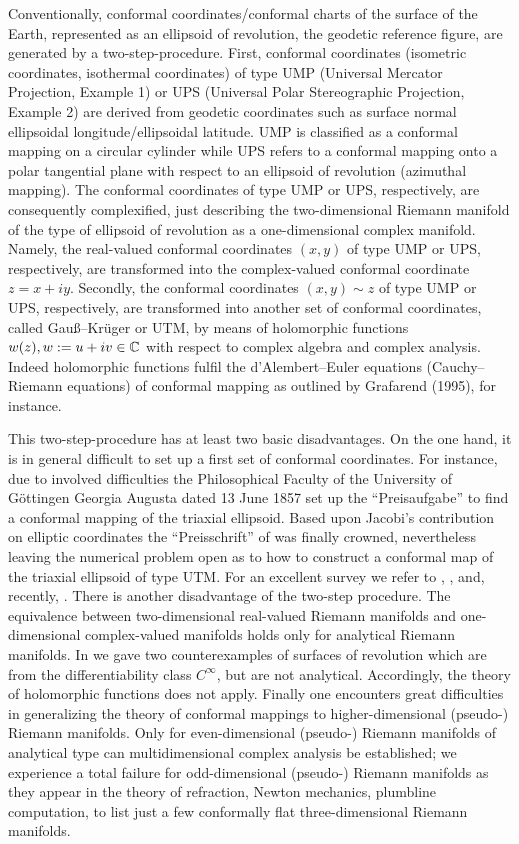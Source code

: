 \documentclass[jog]{svjour}
\begin{document}
Conventionally, conformal coordinates/conformal charts of the surface of
the Earth, represented as an ellipsoid of revolution, the geodetic
reference figure, are generated by a two-step-procedure. First,
conformal coordinates (isometric coordinates, isothermal coordinates) of
type UMP (Universal Mercator Projection, Example 1) or UPS (Universal
Polar Stereographic Projection, Example 2) are derived from geodetic
coordinates such as surface normal ellipsoidal longitude/ellipsoidal
latitude. UMP is classified as a conformal mapping on a circular
cylinder while UPS refers to a conformal mapping onto a polar tangential
plane with respect to an ellipsoid of revolution (azimuthal mapping).
The conformal coordinates of type UMP or UPS, respectively, are
consequently complexified, just describing the two-dimensional Riemann
manifold of the type of ellipsoid of revolution as a one-dimensional
complex manifold. Namely, the real-valued conformal coordinates $(x,y)$
of type UMP or UPS, respectively, are transformed into the
complex-valued conformal coordinate $z = x + iy$. Secondly, the
conformal coordinates $(x,y) \sim z$ of type UMP or UPS, respectively,
are transformed into another set of conformal coordinates, called
Gau{\ss}--Kr\"{u}ger or UTM, by means of holomorphic functions $w(z),
w:=u+iv \in \Bbb{C}$ with respect to complex algebra and complex
analysis. Indeed holomorphic functions fulfil the d'Alembert--Euler
equations (Cauchy--Riemann equations) of conformal mapping as outlined
by Grafarend (1995), for instance.

This two-step-procedure has at least two basic disadvantages. On the one
hand, it is in general difficult to set up a first set of conformal
coordinates. For instance, due to involved difficulties the
Philosophical Faculty of the University of G\"{o}ttingen Georgia Augusta
dated 13 June 1857 set up the ``Preisaufgabe'' to find a conformal
mapping of the triaxial ellipsoid. Based upon Jacobi's contribution on
elliptic coordinates \citep{jac39} the ``Preisschrift'' of
\citet{scher57} was finally crowned, nevertheless leaving the numerical
problem open as to how to construct a conformal map of the triaxial
ellipsoid of type UTM. For an excellent survey we refer to
\citet{kli82}, \citet{schm27}, and, recently, \citet{mul91}. There is
another disadvantage of the two-step procedure. The equivalence between
two-dimensional real-valued Riemann manifolds and one-dimensional
complex-valued manifolds holds only for analytical Riemann manifolds. In
\citet{graf95a} we gave two counterexamples of surfaces of revolution
which are from the differentiability class $C^\infty$, but are not
analytical. Accordingly, the theory of holomorphic functions does not
apply. Finally one encounters great difficulties in generalizing the
theory of conformal mappings to higher-dimensional (pseudo-) Riemann
manifolds. Only for even-dimensional (pseudo-) Riemann manifolds of
analytical type can multidimensional complex analysis be established; we
experience a total failure for odd-dimensional (pseudo-) Riemann
manifolds as they appear in the theory of refraction, Newton mechanics,
plumbline computation, to list just a few conformally flat
three-dimensional Riemann manifolds.
\end{document}
